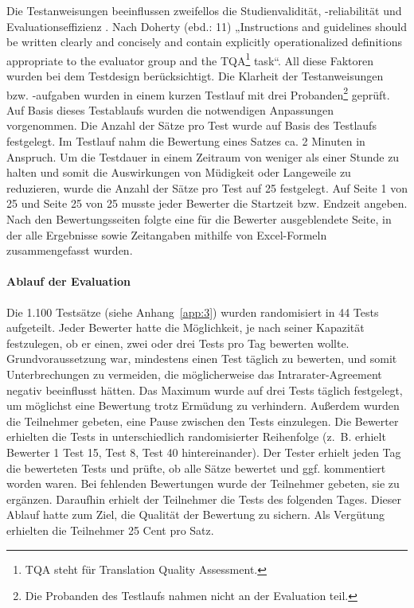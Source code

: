 Die Testanweisungen beeinflussen zweifellos die Studienvalidität, -reliabilität und Evaluationseffizienz \citep{Doherty2017}. Nach Doherty (ebd.: 11) „Instructions and guidelines should be written clearly and concisely and contain explicitly operationalized definitions appropriate to the evaluator group and the TQA\footnote{{TQA steht für Translation Quality Assessment.}} task“. All diese Faktoren wurden bei dem Testdesign berücksichtigt. Die Klarheit der Testanweisungen bzw. -aufgaben wurden in einem kurzen Testlauf mit drei Probanden\footnote{{Die Probanden des Testlaufs nahmen nicht an der Evaluation teil.}} geprüft. Auf Basis dieses Testablaufs wurden die notwendigen Anpassungen vorgenommen. Die Anzahl der Sätze pro Test wurde auf Basis des Testlaufs festgelegt. Im Testlauf nahm die Bewertung eines Satzes ca. 2 Minuten in Anspruch. Um die Testdauer in einem Zeitraum von weniger als einer Stunde zu halten und somit die Auswirkungen von Müdigkeit oder Langeweile zu reduzieren, wurde die Anzahl der Sätze pro Test auf 25 festgelegt. Auf Seite 1 von 25 und Seite 25 von 25 musste jeder Bewerter die Startzeit bzw. Endzeit angeben. Nach den Bewertungsseiten folgte eine für die Bewerter ausgeblendete Seite, in der alle Ergebnisse sowie Zeitangaben mithilfe von Excel-Formeln zusammengefasst wurden.

\paragraph*{Ablauf der Evaluation}

Die 1.100 Testsätze (siehe Anhang~\ref{app:3}) wurden randomisiert in 44 Tests aufgeteilt. Jeder Bewerter hatte die Möglichkeit, je nach seiner Kapazität festzulegen, ob er einen, zwei oder drei Tests pro Tag bewerten wollte. Grundvoraussetzung war, mindestens einen Test täglich zu bewerten, und somit Unterbrechungen zu vermeiden, die möglicherweise das Intrarater-Agreement negativ beeinflusst hätten. Das Maximum wurde auf drei Tests täglich festgelegt, um möglichst eine Bewertung trotz Ermüdung zu verhindern. Außerdem wurden die Teilnehmer gebeten, eine Pause zwischen den Tests einzulegen. Die Bewerter erhielten die Tests in unterschiedlich randomisierter Reihenfolge (z.~B. erhielt Bewerter 1 Test 15, Test 8, Test 40 hintereinander). Der Tester erhielt jeden Tag die bewerteten Tests und prüfte, ob alle Sätze bewertet und ggf. kommentiert worden waren. Bei fehlenden Bewertungen wurde der Teilnehmer gebeten, sie zu ergänzen. Daraufhin erhielt der Teilnehmer die Tests des folgenden Tages. Dieser Ablauf hatte zum Ziel, die Qualität der Bewertung zu sichern. Als Vergütung erhielten die Teilnehmer 25 Cent pro Satz.

